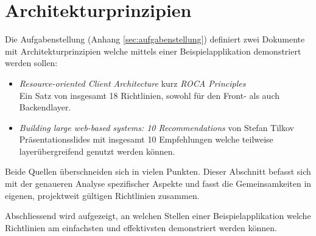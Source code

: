\section{Architekturprinzipien}

Die Aufgabenstellung (Anhang \ref{sec:aufgabenstellung}) definiert zwei Dokumente mit Architekturprinzipien welche mittels einer Beispielapplikation demonstriert werden sollen:

\begin{itemize}
	\item \textit{Resource-oriented Client Architecture} kurz \textit{ROCA Principles} \cite{ROCA}\\
	Ein Satz von insgesamt 18 Richtlinien, sowohl für den Front- als auch Backendlayer.
	\item \textit{Building large web-based systems: 10 Recommendations} von Stefan Tilkov \cite{TilkovSlides}\\
	Präsentationsslides mit insgesamt 10 Empfehlungen welche teilweise layerübergreifend genutzt werden können.
\end{itemize}

Beide Quellen überschneiden sich in vielen Punkten. Dieser Abschnitt befasst sich mit der genaueren Analyse spezifischer Aspekte und fasst die Gemeinsamkeiten in eigenen, projektweit gültigen Richtlinien zusammen. 

Abschliessend wird aufgezeigt, an welchen Stellen einer Beispielapplikation welche Richtlinien am einfachsten und effektivsten demonstriert werden können.








